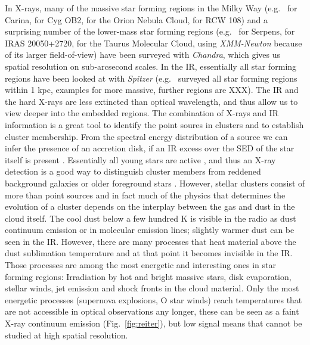 \documentclass[12pt]{article}
\begin{document}
In X-rays, many of the massive star forming regions in the Milky Way (e.g.\ \citealt{2011ApJS..194....1T} for Carina, \citealt{2010ApJ...713..871W} for Cyg OB2, \citealt{2005ApJS..160..379F} for the Orion Nebula Cloud, \citealt{2008AJ....135..693W} for RCW 108) and a surprising number of the lower-mass star forming regions (e.g.\ \citealt{2018AJ....155..241W} for Serpens, \citealt{2012AJ....144..101G} for IRAS 20050+2720, \citealt{2007A&A...468..353G} for the Taurus Molecular Cloud, using \emph{XMM-Newton} because of its larger field-of-view) have been surveyed with \emph{Chandra}, which gives us spatial resolution on sub-arcsecond scales. In the IR, essentially all star forming regions have been looked at with \emph{Spitzer} (e.g.\ \citealt{2009ApJS..184...18G} surveyed all star forming regions within 1 kpc, examples for more massive, further regions are XXX). The IR and the hard X-rays are less extincted than optical wavelength, and thus allow us to view deeper into the embedded regions. The combination of X-rays and IR information is a great tool to identify the point soures in clusters and to establish cluster membership. From the spectral energy distribution of a source we can infer the presence of an accretion disk, if an IR excess over the SED of the star itself is present \citep{2009ApJS..184...18G}. Essentially all young stars are active \citep{2018ApJS..235...43T}, and thus an X-ray detection is a good way to distinguish cluster members from reddened background galaxies or older foreground stars \citep{2013ApJS..209...32B}. However, stellar clusters consist of more than point sources and in fact much of the physics that determines the evolution of a cluster depends on the interplay between the gas and dust in the cloud itself. The cool dust below a few hundred K is visible in the radio as dust continuum emission or in molecular emission lines; slightly warmer dust can be seen in the IR. However, there are many processes that heat material above the dust sublimation temperature and at that point it becomes invisible in the IR. Those processes are among the most energetic and interesting ones in star forming regions: Irradiation by hot and bright massive stars, disk evaporation, stellar winds, jet emission and shock fronts in the cloud material. Only the most energetic processes (supernova explosions, O star winds) reach temperatures that are not accessible in optical observations any longer, these can be seen as a faint X-ray continuum emission (Fig.~\ref{fig:reiter}), but low signal means that cannot be studied at high spatial resolution.
\end{document}
